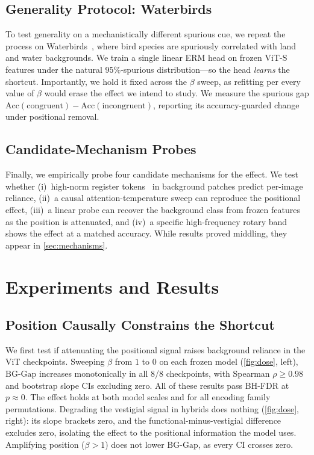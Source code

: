 \documentclass[10pt,twocolumn,letterpaper]{article}
\begin{document}
\subsection{Generality Protocol: Waterbirds}
\label{sec:waterbirds}
To test generality on a mechanistically different spurious cue, we repeat the process on Waterbirds~\cite{sagawa2020}, where bird species are spuriously correlated with land and water backgrounds. We train a single linear ERM head on frozen ViT-S features under the natural $95\%$-spurious distribution---so the head \emph{learns} the shortcut. Importantly, we hold it fixed across the $\beta$ sweep, as refitting per every value of $\beta$ would erase the effect we intend to study. We measure the spurious gap $\mathrm{Acc}(\text{congruent})-\mathrm{Acc}(\text{incongruent})$, reporting its accuracy-guarded change under positional removal.

\subsection{Candidate-Mechanism Probes}
\label{sec:probes}
Finally, we empirically probe four candidate mechanisms for the effect. We test whether (i)~high-norm register tokens~\cite{darcet2024} in background patches predict per-image reliance, (ii)~a causal attention-temperature sweep can reproduce the positional effect, (iii)~a linear probe can recover the background class from frozen features as the position is attenuated, and (iv)~a specific high-frequency rotary band shows the effect at a matched accuracy. While results proved middling, they appear in \cref{sec:mechanisms}.

\section{Experiments and Results}
\label{sec:results}

\subsection{Position Causally Constrains the Shortcut}
We first test if attenuating the positional signal raises background reliance in the ViT checkpoints. Sweeping $\beta$ from $1$ to $0$ on each frozen model (\cref{fig:dose}, left), $\mathrm{BG\text{-}Gap}$ increases monotonically in all 8/8 checkpoints, with Spearman $\rho \ge 0.98$ and bootstrap slope CIs excluding zero. All of these results pass BH-FDR at $p \approx 0$. The effect holds at both model scales and for all encoding family permutations. Degrading the vestigial signal in hybrids does nothing (\cref{fig:dose}, right): its slope brackets zero, and the functional-minus-vestigial difference excludes zero, isolating the effect to the positional information the model uses. Amplifying position ($\beta > 1$) does not lower $\mathrm{BG\text{-}Gap}$, as every CI crosses zero.
\end{document}
